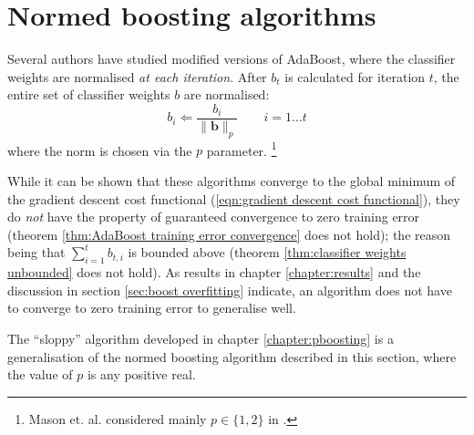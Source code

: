 \section{Normed boosting algorithms}

Several authors \cite{Mason99a, Breiman97} have studied modified
versions of AdaBoost, where the classifier weights are
normalised \emph{at each iteration}.  After $b_t$ is calculated for
iteration $t$, the entire set of classifier weights $b$ are
normalised:
%
\begin{equation}
b_{i} \Leftarrow \frac{b_i}{\| \mathbf{b} \|_p} \qquad  i=1
\ldots t
\end{equation}
%
where the norm is chosen via the $p$ parameter.%
\footnote{Mason et. al. considered mainly $p \in \{ 1,2 \}$ in
\cite{Mason99a}.}

While it can be shown that these algorithms converge to the global
minimum of the gradient descent cost functional (\ref{eqn:gradient
descent cost functional}), they do \emph{not} have the property of
guaranteed convergence to zero training error (theorem
\ref{thm:AdaBoost training error convergence} does not hold); the
reason being that  $\sum_{i=1}^t b_{t,i}$ is bounded above (theorem
\ref{thm:classifier weights unbounded} does not hold).  As results in
chapter \ref{chapter:results} and the discussion in section
\ref{sec:boost overfitting} indicate, an algorithm does not have to
converge to zero training error to generalise well.

The ``sloppy'' algorithm developed in chapter \ref{chapter:pboosting}
is a generalisation of the normed boosting algorithm described in this
section, where the value of $p$ is any positive real.






